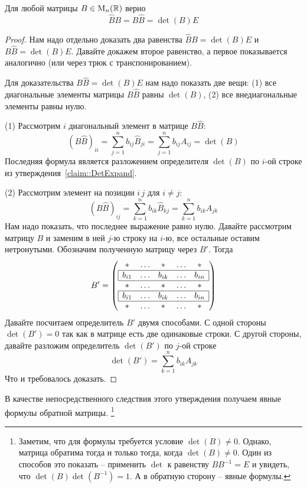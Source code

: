 \begin{claim}
\label{claim::InvMatExplicite}
Для любой матрицы $B\in \operatorname{M}_{n}(\mathbb R)$ верно 
\[
\hat B B = B\hat B = \det(B) E
\]
\end{claim}
\begin{proof}
Нам надо отдельно доказать два равенства $\hat B B = \det (B) E$ и $B\hat B = \det (B) E$.
Давайте докажем второе равенство, а первое показывается аналогично (или через трюк с транспонированием).

Для доказательства $B\hat B = \det (B) E$ нам надо показать две вещи:
(1) все диагональные элементы матрицы $B\hat B$ равны $\det (B)$, (2) все внедиагональные элементы равны нулю.

(1) Рассмотрим $i$ диагональный элемент в матрице $B\hat B$:
\[
(B\hat B)_{ii} = \sum_{j=1}^n b_{ij}\hat B_{ji} = \sum_{j=1}^n b_{ij}A_{ij}=\det(B)
\]
Последняя формула является разложением определителя $\det (B)$ по $i$-ой строке из утверждения~\ref{claim::DetExpand}.

(2) Рассмотрим элемент на позиции $i\,j$ для $i\neq j$:
\[
(B\hat B)_{ij} = \sum_{k=1}^n b_{ik}\hat B_{kj} = \sum_{k=1}^n b_{ik}A_{jk}
\]
Нам надо показать, что последнее выражение равно нулю.
Давайте рассмотрим матрицу $B$ и заменим в ней $j$-ю строку на $i$-ю, все остальные оставим нетронутыми.
Обозначим полученную матрицу через $B'$. Тогда
\[
B' =
\left(
\begin{array}{ccccc}
{*}&{\ldots}&{*}&{\ldots}&{*}\\
\hline
\multicolumn{1}{|c}{b_{i1}}&{\ldots}&{b_{ik}}&{\ldots}&\multicolumn{1}{c|}{b_{in}}\\
\hline
{*}&{\ldots}&{*}&{\ldots}&{*}\\
\hline
\multicolumn{1}{|c}{b_{i1}}&{\ldots}&{b_{ik}}&{\ldots}&\multicolumn{1}{c|}{b_{in}}\\
\hline
{*}&{\ldots}&{*}&{\ldots}&{*}\\
\end{array}
\right)
\]
Давайте посчитаем определитель $B'$ двумя способами.
С одной стороны $\det(B') = 0$ так как в матрице есть две одинаковые строки.
С другой стороны, давайте разложим определитель $\det(B')$ по $j$-ой строке
\[
\det (B') = \sum_{k=1}^n b_{ik}A_{jk}
\]
Что и требовалось доказать.
\end{proof}

В качестве непосредственного следствия этого утверждения получаем явные формулы обратной матрицы.%
\footnote{Заметим, что для формулы требуется условие $\det (B)\neq 0$.
Однако, матрица обратима тогда и только тогда, когда $\det(B)\neq 0$.
Один из способов это показать -- применить $\det$ к равенству $B B^{-1} = E$ и увидеть, что $\det(B) \det(B^{-1}) = 1$.
А в обратную сторону -- явные формулы.}

